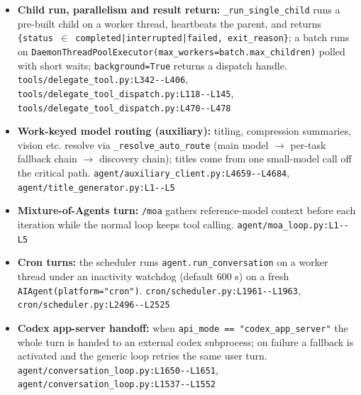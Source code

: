 \begin{itemize}
\item \textbf{Child run, parallelism and result return:} \texttt{\_\allowbreak{}run\_\allowbreak{}single\_\allowbreak{}child} runs a pre-built child on a worker thread, heartbeats the parent, and returns \texttt{\{status $\in$ completed|interrupted|failed, exit\_\allowbreak{}reason\}}; a batch runs on \texttt{DaemonThreadPoolExecutor(\allowbreak{}max\_\allowbreak{}workers=batch.\allowbreak{}max\_\allowbreak{}children)} polled with short waits; \texttt{background=True} returns a dispatch handle. \texttt{tools/\allowbreak{}delegate\_\allowbreak{}tool.\allowbreak{}py:\allowbreak{}L342-\allowbreak{}-\allowbreak{}L406}, \texttt{tools/\allowbreak{}delegate\_\allowbreak{}tool\_\allowbreak{}dispatch.\allowbreak{}py:\allowbreak{}L118-\allowbreak{}-\allowbreak{}L145}, \texttt{tools/\allowbreak{}delegate\_\allowbreak{}tool\_\allowbreak{}dispatch.\allowbreak{}py:\allowbreak{}L470-\allowbreak{}-\allowbreak{}L478}
\item \textbf{Work-keyed model routing (auxiliary):} titling, compression summaries, vision etc. resolve via \texttt{\_\allowbreak{}resolve\_\allowbreak{}auto\_\allowbreak{}route} (main model $\rightarrow$ per-task fallback chain $\rightarrow$ discovery chain); titles come from one small-model call off the critical path. \texttt{agent/\allowbreak{}auxiliary\_\allowbreak{}client.\allowbreak{}py:\allowbreak{}L4659-\allowbreak{}-\allowbreak{}L4684}, \texttt{agent/\allowbreak{}title\_\allowbreak{}generator.\allowbreak{}py:\allowbreak{}L1-\allowbreak{}-\allowbreak{}L5}
\item \textbf{Mixture-of-Agents turn:} \texttt{/\allowbreak{}moa} gathers reference-model context before each iteration while the normal loop keeps tool calling. \texttt{agent/\allowbreak{}moa\_\allowbreak{}loop.\allowbreak{}py:\allowbreak{}L1-\allowbreak{}-\allowbreak{}L5}
\item \textbf{Cron turns:} the scheduler runs \texttt{agent.\allowbreak{}run\_\allowbreak{}conversation} on a worker thread under an inactivity watchdog (default 600 s) on a fresh \texttt{AIAgent(\allowbreak{}platform="cron")}. \texttt{cron/\allowbreak{}scheduler.\allowbreak{}py:\allowbreak{}L1961-\allowbreak{}-\allowbreak{}L1963}, \texttt{cron/\allowbreak{}scheduler.\allowbreak{}py:\allowbreak{}L2496-\allowbreak{}-\allowbreak{}L2525}
\item \textbf{Codex app-server handoff:} when \texttt{api\_\allowbreak{}mode == "codex\_\allowbreak{}app\_\allowbreak{}server"} the whole turn is handed to an external codex subprocess; on failure a fallback is activated and the generic loop retries the same user turn. \texttt{agent/\allowbreak{}conversation\_\allowbreak{}loop.\allowbreak{}py:\allowbreak{}L1650-\allowbreak{}-\allowbreak{}L1651}, \texttt{agent/\allowbreak{}conversation\_\allowbreak{}loop.\allowbreak{}py:\allowbreak{}L1537-\allowbreak{}-\allowbreak{}L1552}
\end{itemize}

